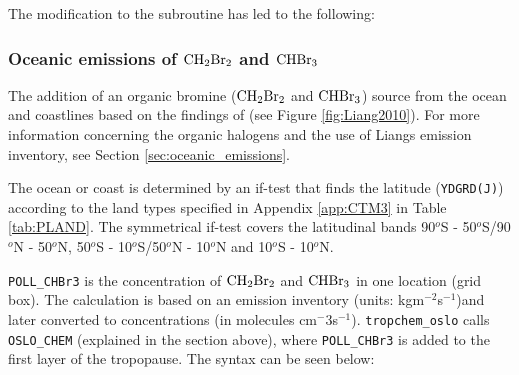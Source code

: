 The modification to the subroutine has led to the following: 


\subsubsection{Oceanic emissions of $\mathrm{CH_2Br_2}$ and $\mathrm{CHBr_3}$}\label{sec:impl_ocean_source}

The addition of an organic bromine ($\mathrm{CH_2Br_2}$ and $\mathrm{CHBr_3}$) source from the ocean and coastlines based on the findings of \cite{Liang2010} (see Figure \ref{fig:Liang2010}). For more information concerning the organic halogens and the use of Liangs emission inventory, see Section \ref{sec:oceanic_emissions}.

\medskip

The ocean or coast is determined by an if-test that finds the latitude (\texttt{YDGRD(J)}) according to the land types specified in Appendix \ref{app:CTM3} in Table \ref{tab:PLAND}. The symmetrical if-test covers the latitudinal bands 90$^o$S - 50$^o$S/90$^o$N - 50$^o$N, 50$^o$S - 10$^o$S/50$^o$N - 10$^o$N and 10$^o$S - 10$^o$N. 

\medskip

\texttt{POLL\_CHBr3} is the concentration of $\mathrm{CH_2Br_2}$ and $\mathrm{CHBr_3}$ in one location (grid box). The calculation is based on an emission inventory  (units: kgm$^{-2}$s$^{-1}$)and later converted to concentrations (in molecules cm$^-{3}$s$^{-1}$). \texttt{tropchem\_oslo} calls \texttt{OSLO\_CHEM} (explained in the section above), where \texttt{POLL\_CHBr3} is added to the first layer of the tropopause. The syntax can be seen below:


